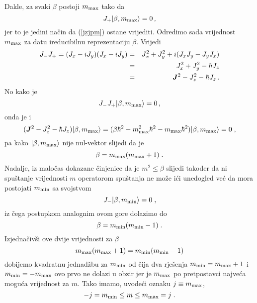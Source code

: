 Dakle, za svaki $\beta$ postoji $m_{\textrm{\scriptsize max}}$ tako da 
\begin{displaymath}
 J_+ | \beta, m_{\textrm{\scriptsize max}} \rangle = 0 \,,
\end{displaymath}
jer to je jedini način da (\ref{jzjpm}) ostane vrijediti.
Odredimo sada vrijednost $m_{\textrm{\scriptsize max}}$ za datu
ireducibilnu reprezentaciju $\beta$. Vrijedi
\begin{eqnarray*}
J_- J_+ =(J_x - i J_y)(J_x - i J_y)
   & = &J_{x}^2 + J_{y}^2 +i (J_x J_y - J_y J_x) \\
 & = & J_{x}^2 + J_{y}^2 - \hbar J_z \\
 & = & \jsq - J_{z}^2 - \hbar J_z \,.
\end{eqnarray*}
No kako je 
\begin{displaymath}
J_- J_+ | \beta, m_{\textrm{\scriptsize max}} \rangle = 0 \,,
\end{displaymath}
onda je i
\begin{displaymath}
 (\jsq - J_{z}^2 - \hbar J_z)\ket{\beta, m_{\textrm{\scriptsize max}}}
 = (\beta\hbar^2 - m_{\textrm{\scriptsize max}}^2 \hbar^2 
                 - m_{\textrm{\scriptsize max}}   \hbar^2 )
\ket{\beta, m_{\textrm{\scriptsize max}}} = 0 \;,
\end{displaymath}
pa kako $| \beta, m_{\textrm{\scriptsize max}} \rangle$ nije nul-vektor
slijedi da je
\begin{displaymath}
    \beta = m_{\textrm{\scriptsize max}} ( m_{\textrm{\scriptsize max}} +1)\;.
\end{displaymath}
Nadalje, iz maločas dokazane činjenice da je $m^2 \le \beta$ slijedi također
da ni spuštanje vrijednosti $m$ operatorom spuštanja ne može ići
unedogled već da mora postojati $m_{\textrm{\scriptsize min}}$
sa svojstvom
\begin{displaymath}
    J_- | \beta, m_{\textrm{\scriptsize min}} \rangle = 0 \;,
\end{displaymath}
iz čega postupkom analognim ovom gore dolazimo do
\begin{displaymath}
    \beta = m_{\textrm{\scriptsize min}} ( m_{\textrm{\scriptsize min}} -1)\;.
\end{displaymath}
Izjednačivši ove dvije vrijednosti za $\beta$ 
\begin{displaymath}
            m_{\textrm{\scriptsize max}} ( m_{\textrm{\scriptsize max}} +1)
= m_{\textrm{\scriptsize min}} ( m_{\textrm{\scriptsize min}} -1)
\end{displaymath}
dobijemo kvadratnu jednadžbu za $m_{\textrm{\scriptsize min}}$ od čija
dva rješenja $m_{\textrm{\scriptsize min}}=m_{\textrm{\scriptsize max}}+1$
i $m_{\textrm{\scriptsize min}} = - m_{\textrm{\scriptsize max}}$ ovo
prvo ne dolazi u obzir jer je $m_{\textrm{\scriptsize max}}$ po pretpostavci
najveća moguća vrijednost za $m$. Tako imamo, uvodeći oznaku
$j\equiv m_{\textrm{\scriptsize max}}$,
\begin{displaymath}
               -j = m_{\textrm{\scriptsize min}} \le m \le 
 m_{\textrm{\scriptsize max}} = j   \;.
\end{displaymath}

